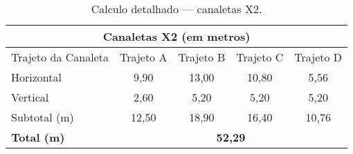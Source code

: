 \begin{table}[H]
\caption{Calculo detalhado --- canaletas X2.}
\label{tab6}
\begin{center}
	\renewcommand{\arraystretch}{1.2}
\begin{tabular}{|l|c|c|c|c|}
	\hline
	\multicolumn{5}{|c|}{\textbf{Canaletas X2 (em metros)}}                                                                                                 \\ \hline
	Trajeto da Canaleta & \multicolumn{1}{l|}{Trajeto A} & \multicolumn{1}{l|}{Trajeto B} & \multicolumn{1}{l|}{Trajeto C} & \multicolumn{1}{l|}{Trajeto D} \\ \hline
	Horizontal          & 9,90                           & 13,00                          & 10,80                          & 5,56                           \\ \hline
	Vertical            & 2,60                           & 5,20                           & 5,20                           & 5,20                           \\ \hline
	Subtotal (m)        & 12,50                          & 18,90                          & 16,40                          & 10,76                          \\ \hline
	\textbf{Total (m)}  & \multicolumn{4}{c|}{\textbf{52,29}}                                                                                               \\ \hline
\end{tabular}
\end{center}
\end{table}
